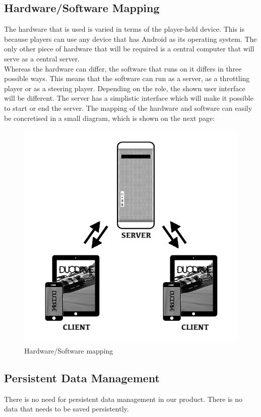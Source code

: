 \documentclass[11pt,twoside,a4paper]{article}
\begin{document}
\subsection{Hardware/Software Mapping}
The hardware that is used is varied in terms of the player-held device. This is because players can use any device that has Android as its operating system. The only other piece of hardware that will be required is a central computer that will serve as a central server. \\
Whereas the hardware can differ, the software that runs on it differs in three possible ways. This means that the software can run as a server, as a throttling player or as a steering player. Depending on the role, the shown user interface will be different. The server has a simplistic interface which will make it possible to start or end the server.
The mapping of the hardware and software can easily be concretised in a small diagram, which is shown on the next page:
\begin{figure}
	\includegraphics[width=\textwidth]{ClientServer.png}
	\caption{Hardware/Software mapping}
\end{figure}

\newpage

\subsection{Persistent Data Management}
There is no need for persistent data management in our product. There is no data that needs to be saved persistently.
\end{document}
